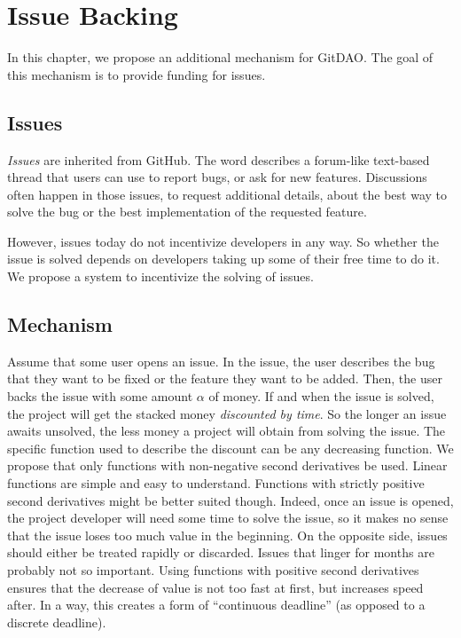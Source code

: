 \chapter{Issue Backing}
\label{sec:issue_backing}

In this chapter, we propose an additional mechanism for GitDAO.
The goal of this mechanism is to provide funding for issues.

\section{Issues}

\emph{Issues} are inherited from GitHub.
The word describes a forum-like text-based thread that users can use to report bugs, or ask for new features.
Discussions often happen in those issues, to request additional details, about the best way to solve the bug or the best implementation of the requested feature.

However, issues today do not incentivize developers in any way.
So whether the issue is solved depends on developers taking up some of their free time to do it.
We propose a system to incentivize the solving of issues.

\section{Mechanism}

Assume that some user opens an issue.
In the issue, the user describes the bug that they want to be fixed or the feature they want to be added.
Then, the user backs the issue with some amount $\alpha$ of money.
If and when the issue is solved, the project will get the stacked money \emph{discounted by time}.
So the longer an issue awaits unsolved, the less money a project will obtain from solving the issue.
The specific function used to describe the discount can be any decreasing function.
We propose that only functions with non-negative second derivatives be used.
Linear functions are simple and easy to understand.
Functions with strictly positive second derivatives might be better suited though.
Indeed, once an issue is opened, the project developer will need some time to solve the issue, so it makes no sense that the issue loses too much value in the beginning.
On the opposite side, issues should either be treated rapidly or discarded.
Issues that linger for months are probably not so important.
Using functions with positive second derivatives ensures that the decrease of value is not too fast at first, but increases speed after.
In a way, this creates a form of \enquote{continuous deadline} (as opposed to a discrete deadline).

